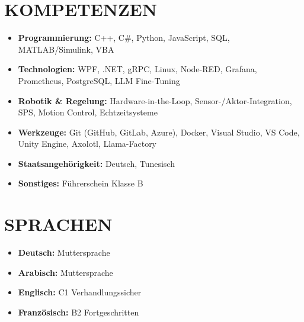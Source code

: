 \documentclass[10pt,a4paper]{article}
\begin{document}
\hfill
\begin{minipage}[t]{0.30\textwidth}

    \section*{KOMPETENZEN}
    \begin{itemize}
        \item \textbf{Programmierung:} C++, C\#, Python, JavaScript, SQL, MATLAB/Simulink, VBA
        \item \textbf{Technologien:} WPF, .NET, gRPC, Linux, Node-RED, Grafana, Prometheus, PostgreSQL, LLM Fine-Tuning
        \item \textbf{Robotik \& Regelung:} Hardware-in-the-Loop, Sensor-/Aktor-Integration, SPS, Motion Control, Echtzeitsysteme
        \item \textbf{Werkzeuge:} Git (GitHub, GitLab, Azure), Docker, Visual Studio, VS Code, Unity Engine, Axolotl, Llama-Factory
        \item \textbf{Staatsangehörigkeit:} Deutsch, Tunesisch
        \item \textbf{Sonstiges:} Führerschein Klasse B
    \end{itemize}
    
    \section*{SPRACHEN}
    \begin{itemize}
        \item \textbf{Deutsch:} Muttersprache
        \item \textbf{Arabisch:} Muttersprache
        \item \textbf{Englisch:} C1 Verhandlungssicher
        \item \textbf{Französisch:} B2 Fortgeschritten
    \end{itemize}
    
    \vspace{0.6em}
    

\end{minipage}
\end{document}
